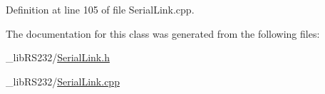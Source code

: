 Definition at line 105 of file Serial\+Link.\+cpp.



The documentation for this class was generated from the following files\+:\begin{DoxyCompactItemize}
\item 
\+\_\+lib\+R\+S232/\hyperlink{_serial_link_8h}{Serial\+Link.\+h}\item 
\+\_\+lib\+R\+S232/\hyperlink{_serial_link_8cpp}{Serial\+Link.\+cpp}\end{DoxyCompactItemize}
